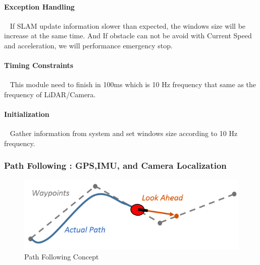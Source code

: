 \documentclass[12pt]{article}
\begin{document}
            \paragraph{Exception Handling}
                ~\newline
                If SLAM update information slower than expected, the windows size will be increase at the same time. And If obstacle can not be avoid with Current Speed and acceleration, we will performance emergency stop. 
                                
            \paragraph{Timing Constraints}
                ~\newline
                This module need to finish in 100ms which is 10 Hz frequency that same as the frequency of LiDAR/Camera. 
                
            \paragraph{Initialization}       
                ~\newline
                Gather information from system and set windows size according to 10 Hz frequency.
                
        \subsubsection{Path Following : GPS,IMU, and Camera Localization}
            \begin{figure}[H]
                \centering
                \includegraphics[width=\textwidth,height=\textheight,keepaspectratio]{../path_following.png}
                \caption{Path Following Concept}
            \end{figure}
            
\end{document}
